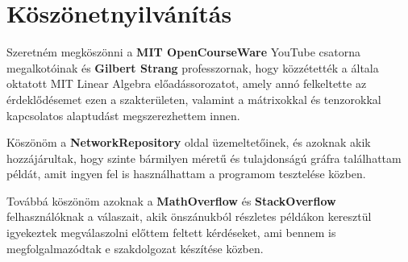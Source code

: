 \documentclass[12pt,numbers=noenddot]{report}
\begin{document}
\chapter*{Köszönetnyilvánítás}

Szeretném megköszönni a \textbf{MIT OpenCourseWare} YouTube csatorna 
megalkotóinak és \textbf{Gilbert Strang} professzornak, hogy közzétették a általa 
oktatott MIT Linear Algebra előadássorozatot, amely annó felkeltette 
az érdeklődésemet ezen a szakterületen, valamint a mátrixokkal és tenzorokkal 
kapcsolatos alaptudást megszerezhettem innen.

Köszönöm a \textbf{NetworkRepository} oldal üzemeltetőinek, és azoknak akik 
hozzájárultak, hogy szinte bármilyen méretű és tulajdonságú gráfra találhattam
példát, amit ingyen fel is használhattam a programom tesztelése közben.

Továbbá köszönöm azoknak a \textbf{MathOverflow} és \textbf{StackOverflow}
felhasználóknak a válaszait, akik önszánukból részletes példákon keresztül
igyekeztek megválaszolni előttem feltett kérdéseket, ami bennem is 
megfolgalmazódtak e szakdolgozat készítése közben.
\end{document}

